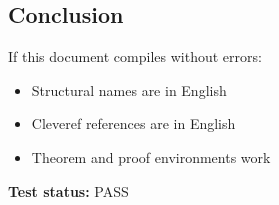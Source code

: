 \begin{latin}
\section{Conclusion}
\label{sec:conclusion}

If this document compiles without errors:

\begin{itemize}
    \item Structural names are in English
    \item Cleveref references are in English
    \item Theorem and proof environments work
\end{itemize}

\textbf{Test status:} PASS

\end{latin}


